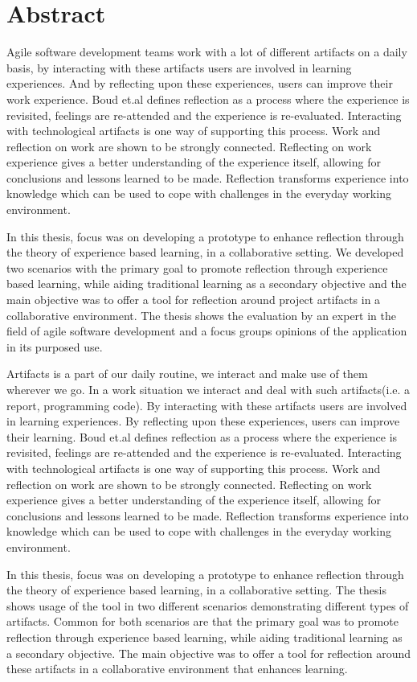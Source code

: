 \chapter*{Abstract}
Agile software development teams work with a lot of different artifacts on a daily basis, by interacting with these artifacts users are involved in learning experiences. And by reflecting upon these experiences, users can improve their work experience. Boud et.al defines reflection as a process where the experience is revisited, feelings are re-attended and the experience is re-evaluated\citep{boudreflection1985}. Interacting with technological artifacts is one way of supporting this process. 
Work and reflection on work are shown to be strongly connected\citep{Schon1983}\citep{Chaiklin1993}. Reflecting on work experience gives a better understanding of the experience itself, allowing for conclusions and lessons learned to be made. 
Reflection transforms experience into knowledge which can be used to cope with challenges in the everyday working environment. 

In this thesis, focus was on developing a prototype to enhance reflection through the theory of experience based learning, in a collaborative setting. We developed two scenarios with the primary goal to promote reflection through experience based learning, while aiding traditional learning as a secondary objective and the main objective was to offer a tool for reflection around project artifacts in a collaborative environment. The thesis shows the evaluation by an expert in the field of agile software development and a focus groups opinions of the application in its purposed use.

Artifacts is a part of our daily routine, we interact and make use of them wherever we go. In a work situation we interact and deal with such artifacts(i.e. a report, programming code). By interacting with these artifacts users are involved in learning experiences. By reflecting upon these experiences, users can improve their learning. Boud et.al defines reflection as a process where the experience is revisited, feelings are re-attended and the experience is re-evaluated\citep{boudreflection1985}. Interacting with technological artifacts is one way of supporting this process. 
Work and reflection on work are shown to be strongly connected\citep{Schon1983}\citep{Chaiklin1993}. Reflecting on work experience gives a better understanding of the experience itself, allowing for conclusions and lessons learned to be made. 
Reflection transforms experience into knowledge which can be used to cope with challenges in the everyday working environment. 

In this thesis, focus was on developing a prototype to enhance reflection through the theory of experience based learning, in a collaborative setting. The thesis shows usage of the tool in two different scenarios demonstrating different types of artifacts. Common for both scenarios are that the primary goal was to promote reflection through experience based learning, while aiding traditional learning as a secondary objective. 
The main objective was to offer a tool for reflection around these artifacts in a collaborative environment that enhances learning. 